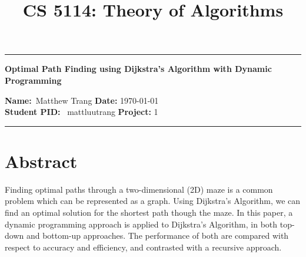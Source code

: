 \documentclass[11pt]{article}
\title{CS 5114: Theory of Algorithms}
\begin{document}


\begin{center}
	\hrule
	\vspace{.4cm}
	{\textbf { \large Optimal Path Finding using Dijkstra's Algorithm with Dynamic Programming}}
\end{center}
\textbf{Name:}\ Matthew Trang \hspace{\fill} \textbf{Date:} \today \\
{ \textbf{Student PID:}} \ mattluutrang \hspace{\fill} \textbf{Project: } 1
\vspace{.4cm}
\hrule

\section*{Abstract}
Finding optimal paths through a two-dimensional (2D) maze is a common problem which can be represented as a graph.
Using Dijkstra's Algorithm, we can find an optimal solution for the shortest path though the maze.
In this paper, a dynamic programming approach is applied to Dijkstra's Algorithm, in both top-down
and bottom-up approaches. The performance of both are compared with respect to accuracy and
efficiency, and contrasted with a recursive approach.
\end{document}
